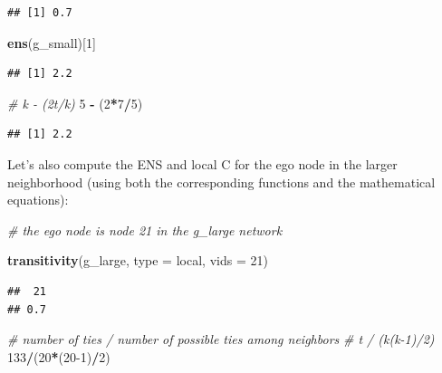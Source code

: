 \documentclass[
]{book}
\newenvironment{Shaded}{\begin{snugshade}}{\end{snugshade}}
\newcommand{\AttributeTok}[1]{\textcolor[rgb]{0.13,0.29,0.53}{#1}}
\newcommand{\CommentTok}[1]{\textcolor[rgb]{0.56,0.35,0.01}{\textit{#1}}}
\newcommand{\DecValTok}[1]{\textcolor[rgb]{0.00,0.00,0.81}{#1}}
\newcommand{\FunctionTok}[1]{\textcolor[rgb]{0.13,0.29,0.53}{\textbf{#1}}}
\newcommand{\NormalTok}[1]{#1}
\newcommand{\SpecialCharTok}[1]{\textcolor[rgb]{0.81,0.36,0.00}{\textbf{#1}}}
\newcommand{\StringTok}[1]{\textcolor[rgb]{0.31,0.60,0.02}{#1}}
\begin{document}
\begin{verbatim}
## [1] 0.7
\end{verbatim}

\begin{Shaded}
\begin{Highlighting}[]
\FunctionTok{ens}\NormalTok{(g\_small)[}\DecValTok{1}\NormalTok{]}
\end{Highlighting}
\end{Shaded}

\begin{verbatim}
## [1] 2.2
\end{verbatim}

\begin{Shaded}
\begin{Highlighting}[]
\CommentTok{\# k {-} (2t/k)}
\DecValTok{5} \SpecialCharTok{{-}}\NormalTok{ (}\DecValTok{2}\SpecialCharTok{*}\DecValTok{7}\SpecialCharTok{/}\DecValTok{5}\NormalTok{)}
\end{Highlighting}
\end{Shaded}

\begin{verbatim}
## [1] 2.2
\end{verbatim}

Let's also compute the ENS and local C for the ego node in the larger neighborhood (using both the corresponding functions and the mathematical equations):

\begin{Shaded}
\begin{Highlighting}[]
\CommentTok{\# the ego node is node 21 in the g\_large network }

\FunctionTok{transitivity}\NormalTok{(g\_large, }\AttributeTok{type =} \StringTok{\textquotesingle{}local\textquotesingle{}}\NormalTok{, }\AttributeTok{vids =} \DecValTok{21}\NormalTok{)}
\end{Highlighting}
\end{Shaded}

\begin{verbatim}
##  21 
## 0.7
\end{verbatim}

\begin{Shaded}
\begin{Highlighting}[]
\CommentTok{\# number of ties / number of possible ties among neighbors }
\CommentTok{\# t / (k(k{-}1)/2)}
\DecValTok{133}\SpecialCharTok{/}\NormalTok{(}\DecValTok{20}\SpecialCharTok{*}\NormalTok{(}\DecValTok{20{-}1}\NormalTok{)}\SpecialCharTok{/}\DecValTok{2}\NormalTok{) }
\end{Highlighting}
\end{Shaded}
\end{document}
